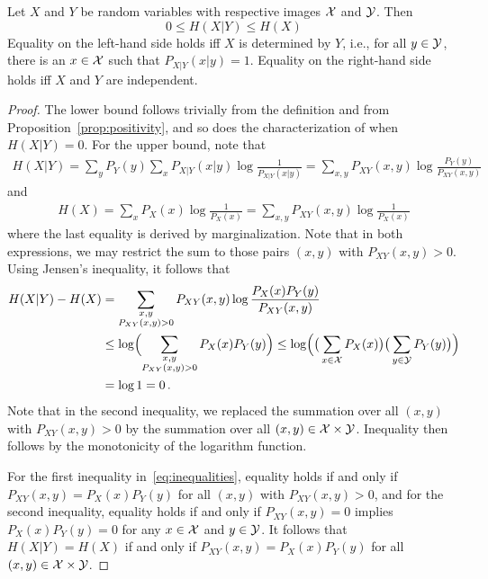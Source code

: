 \begin{proposition}\label{prop:conditional-bounds}
Let $X$ and $Y$ be random variables with respective images ${\cal X}$ and $\cal Y$. Then
\[
0 \leq H(X|Y) \leq H(X)
\]
Equality on the left-hand side holds iff $X$ is determined by $Y$,
i.e., for all $y\in {\cal Y}$, there is an $x\in {\cal X}$ such that
$P_{X|Y}(x|y)=1$.
Equality on the right-hand side holds iff
$X$ and $Y$ are independent.
\end{proposition}
%
\begin{proof}
The lower bound follows trivially from the definition and from Proposition~\ref{prop:positivity}, and so does the characterization of when $H(X|Y) = 0$. For the upper bound, note that
\begin{align}
H(X|Y) = \sum_{y} P_Y(y) \sum_x P_{X|Y}(x|y) \log\frac{1}{P_{X|Y}(x|y)} = \sum_{x,y} P_{XY}(x,y) \log\frac{P_Y(y)}{P_{XY}(x,y)}
\end{align}
and
\begin{align}
H(X) = \sum_x P_{X}(x) \log\frac{1}{P_{X}(x)} = \sum_{x,y} P_{XY}(x,y) \log\frac{1}{P_{X}(x)}
\end{align}
where the last equality is derived by marginalization. Note that in both expressions, we may restrict the sum to those pairs $(x,y)$ with $P_{XY}(x,y) > 0$. 
Using Jensen's inequality, it follows that
\begin{align}
H(X|Y) - H(X) &= \sum_{\substack{x,y\\P_{XY}(x,y)>0}} P_{XY}(x,y)\log
\frac{P_X(x)P_Y(y)}{P_{XY}(x,y)} \nonumber \\
&\leq \log\Bigl( \sum_{\substack{x,y\\P_{XY}(x,y)>0}} P_X(x)P_Y(y) \Bigr) \leq \log\Bigl(\big(\sum_{x \in \mathcal{X}}P_X(x)\big)\big(\sum_{y \in \mathcal{Y}}P_Y(y)\big)\Bigr)\\
&= \log 1 = 0 \, . \nonumber
\label{eq:inequalities}
\end{align}
Note that in the second inequality, we replaced the summation over all $(x,y)$ with $P_{XY}(x,y) > 0$ by the summation over all $(x,y) \in {\cal X} \times {\cal Y}$. Inequality then follows by the monotonicity of the logarithm function.

For the first inequality in~\eqref{eq:inequalities}, equality holds if and only if $P_{XY}(x,y) = P_X(x) P_Y(y)$ for all $(x,y)$ with $P_{XY}(x,y) > 0$, and for the second inequality, equality holds if and only if $P_{XY}(x,y) = 0$ implies $P_X(x) P_Y(y) = 0$ for any $x \in \cal X$ and $y \in \cal Y$. It follows that $H(X|Y) = H(X)$ if and only if $P_{XY}(x,y) = P_X(x) P_Y(y)$ for all $(x,y) \in {\cal X} \times {\cal Y}$. 
\end{proof}


